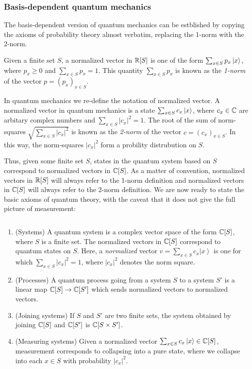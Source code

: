 \subsubsection{Basis-dependent quantum mechanics}

The basis-dependent version of quantum mechanics can be estblished by copying the axioms of probability theory almost verbatim, replacing the 1-norm with the 2-norm.

Given a finite set $S$, a normalized vector in $\mathbb{R}[S]$ is one of the form $\sum_{x\in S}p_x \ket{x}$, where $p_x\geq 0$ and $\sum_{x\in S}p_x=1$.  This quantity $\sum_{x\in S}p_x$ is known as the \textit{1-norm} of the vector $p=(p_x)_{x\in S}$.

In quantum mechanics we re-define the notation of normalized vector. A normalized vector in quantum mechanics is a state $\sum_{x\in S}c_x \ket{x}$, where $c_x\in \mathbb{C}$ are arbitary complex numbers and $\sum_{x\in S}|c_x|^2=1$. The root of the sum of norm-squares $\sqrt{\sum_{x\in S}|c_x|^2}$ is known as the \textit{2-norm} of the vector $c=(c_x)_{x\in S}$. In this way, the norm-squares $|c_x|^2$ form a probility distrubution on $S$.

Thus, given some finite set $S$, states in the quantum system based on $S$ correspond to normalized vectors in $\mathbb{C}[S]$. As a matter of convention, normalized vectors in $\mathbb{R}[S]$ will always refer to the 1-norm definition and normalized vectors in $\mathbb{C}[S]$ will always refer to the 2-norm definition. We are now ready to state the basic axioms of quantum theory, with the caveat that it does not give the full picture of measurement:

\begin{definition} $\,$

\begin{enumerate}
\item (Systems) A quantum system is a complex vector space of the form $\mathbb{C}[S]$, where $S$ is a finite set. The normalized vectors in $\mathbb{C}[S]$ correspond to quantum states on $S$. Here, a \textit{normalized} vector $v=\sum_{x\in S}c_x\left|x\right>$ is one for which $\sum_{x\in S}|c_x|^2=1$, where $|c_x|^2$ denotes the norm square.
\item (Processes) A quantum process going from a system $S$ to a system $S'$ is a linear map $\mathbb{C}[S]\to \mathbb{C}[S']$ which sends normalized vectors to normalized vectors.
\item (Joining systems) If $S$ and $S'$ are two finite sets, the system obtained by joining $\mathbb{C}[S]$ and $\mathbb{C}[S']$ is $\mathbb{C}[S\times S']$.
\item (Measuring systems) Given a normalized vector $\sum_{x\in S}c_x \left |x\right>\in \mathbb{C}[S]$, measurement corresponds to collapsing into a pure state, where we collapse into each $x\in S$ with probability $|c_x|^2$.
\end{enumerate}

\raggedleft\qedsymbol{}
\end{definition}

